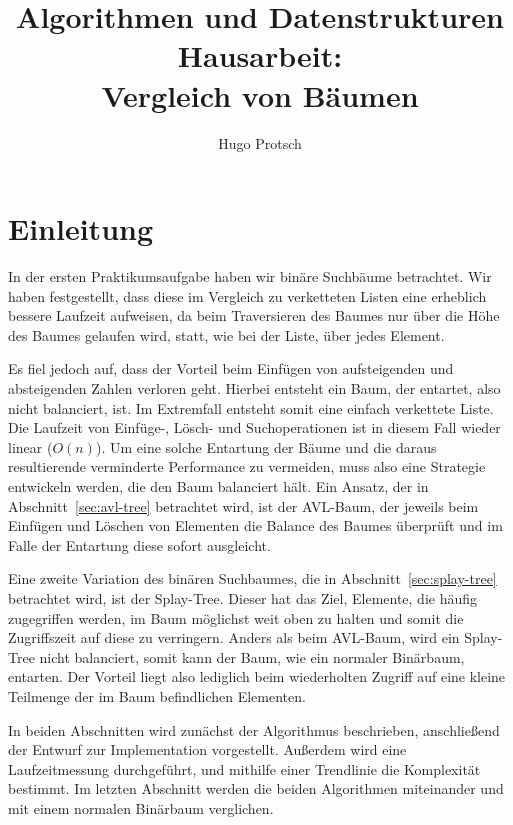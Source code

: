 \documentclass[a4paper]{article}
\title{Algorithmen und Datenstrukturen Hausarbeit:\\Vergleich von Bäumen}
\author{Hugo Protsch}
\begin{document}
    \maketitle
    \tableofcontents
    \newpage
    \section*{Einleitung}\label{sec:Einleitung}

    In der ersten Praktikumsaufgabe haben wir binäre Suchbäume betrachtet.
    Wir haben festgestellt, dass diese im Vergleich zu verketteten Listen eine erheblich
    bessere Laufzeit aufweisen, da beim Traversieren des Baumes nur über die
    Höhe des Baumes gelaufen wird, statt, wie bei der Liste, über jedes Element.

    Es fiel jedoch auf, dass der Vorteil beim Einfügen von aufsteigenden und
    absteigenden Zahlen verloren geht.
    Hierbei entsteht ein Baum, der entartet, also nicht balanciert, ist.
    Im Extremfall entsteht somit eine einfach verkettete Liste.
    Die Laufzeit von Einfüge-, Lösch- und Suchoperationen
    ist in diesem Fall wieder linear (\(O(n)\)).
    Um eine solche Entartung der Bäume und die daraus resultierende verminderte Performance
    zu vermeiden, muss also eine Strategie entwickeln werden, die den Baum balanciert hält.
    Ein Ansatz, der in Abschnitt~\ref{sec:avl-tree} betrachtet wird, ist der AVL-Baum,
    der jeweils beim Einfügen und Löschen von Elementen die
    Balance des Baumes überprüft und im Falle der Entartung diese sofort ausgleicht.

    Eine zweite Variation des binären Suchbaumes, die in Abschnitt~\ref{sec:splay-tree}
    betrachtet wird, ist der Splay-Tree.
    Dieser hat das Ziel, Elemente, die häufig zugegriffen werden, im Baum möglichst weit oben zu
    halten und somit die Zugriffszeit auf diese zu verringern.
    Anders als beim AVL-Baum, wird ein Splay-Tree nicht balanciert, somit kann der Baum, wie ein
    normaler Binärbaum, entarten.
    Der Vorteil liegt also lediglich beim wiederholten Zugriff auf eine kleine Teilmenge der im
    Baum befindlichen Elementen.

    In beiden Abschnitten wird zunächst der Algorithmus beschrieben, anschließend der Entwurf zur
    Implementation vorgestellt.
    Außerdem wird eine Laufzeitmessung durchgeführt, und mithilfe einer Trendlinie die
    Komplexität bestimmt.
    Im letzten Abschnitt werden die beiden Algorithmen miteinander und mit einem normalen Binärbaum
    verglichen.
\end{document}

